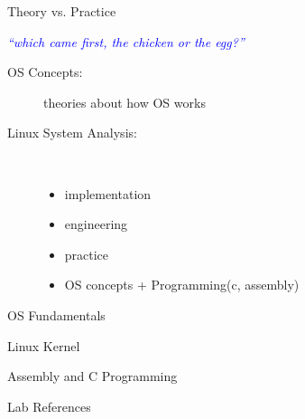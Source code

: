 \begin{frame}{Theory vs. Practice}
  \begin{center}
    \textcolor{blue}{\emph{``which came first, the chicken or the egg?''}}
  \end{center}
  \begin{description}
  \item[OS Concepts:] theories about how OS works
  \item[Linux System Analysis:] \ \\
    \begin{itemize}
    \item implementation
    \item engineering
    \item practice
    \item OS concepts + Programming(c, assembly)
    \end{itemize}
  \end{description}
\end{frame}

\begin{frame}{OS Fundamentals}
  \begin{refsection}
    \nocite{tanenbaum2008modern, silberschatz11essentials, zouhengming09}
    \printbibliography[heading=none]
  \end{refsection}
\end{frame}

\begin{frame}{Linux Kernel}
  \begin{refsection}
    \nocite{corbet05:_linux_devic_driver, bovet2005understanding, mauerer2008professional,
      love2010linux, rodriguez2005linux}
    \printbibliography[heading=none]
  \end{refsection}
\end{frame}

\begin{frame}{Assembly and C Programming}
  \begin{refsection}
    \nocite{bartlett2009programming, carter06:_pc_assem_languag, x86assemblymanual,
      wikibooks-gas, gcc-inline-asm, x86-inline-asm-linux, gcc-gen-asm}
    \printbibliography[heading=none]
  \end{refsection}
\end{frame}

\begin{frame}{Lab References}
  \begin{refsection}
    \nocite{kroah-hartman07:_linux_kernel_nutsh, yuyuan2009orange}
    \printbibliography[heading=none]
  \end{refsection}
\end{frame}

